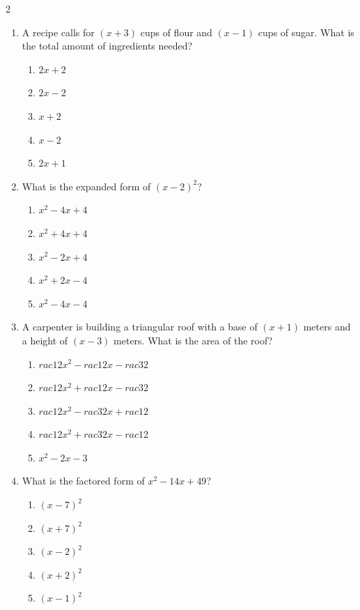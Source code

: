 \documentclass[10pt]{article}
\begin{document}
\begin{multicols}{2}
\begin{enumerate}[label=\textbf{Q\arabic*.}, leftmargin=*, itemsep=6pt, parsep=0pt]
  \item \small A recipe calls for $(x + 3)$ cups of flour and $(x - 1)$ cups of sugar. What is the total amount of ingredients needed?
  \begin{enumerate}[label=(\Alph*), leftmargin=0.6cm, nosep, itemsep=2pt]
    \item $2x + 2$
    \item $2x - 2$
    \item $x + 2$
    \item $x - 2$
    \item $2x + 1$
  \end{enumerate}

  \item \small What is the expanded form of $(x - 2)^2$?
  \begin{enumerate}[label=(\Alph*), leftmargin=0.6cm, nosep, itemsep=2pt]
    \item $x^2 - 4x + 4$
    \item $x^2 + 4x + 4$
    \item $x^2 - 2x + 4$
    \item $x^2 + 2x - 4$
    \item $x^2 - 4x - 4$
  \end{enumerate}

  \item \small A carpenter is building a triangular roof with a base of $(x + 1)$ meters and a height of $(x - 3)$ meters. What is the area of the roof?
  \begin{enumerate}[label=(\Alph*), leftmargin=0.6cm, nosep, itemsep=2pt]
    \item $rac{1}{2}x^2 - rac{1}{2}x - rac{3}{2}$
    \item $rac{1}{2}x^2 + rac{1}{2}x - rac{3}{2}$
    \item $rac{1}{2}x^2 - rac{3}{2}x + rac{1}{2}$
    \item $rac{1}{2}x^2 + rac{3}{2}x - rac{1}{2}$
    \item $x^2 - 2x - 3$
  \end{enumerate}

  \item \small What is the factored form of $x^2 - 14x + 49$?
  \begin{enumerate}[label=(\Alph*), leftmargin=0.6cm, nosep, itemsep=2pt]
    \item $(x - 7)^2$
    \item $(x + 7)^2$
    \item $(x - 2)^2$
    \item $(x + 2)^2$
    \item $(x - 1)^2$
  \end{enumerate}


\end{enumerate}
\end{multicols}
\end{document}
